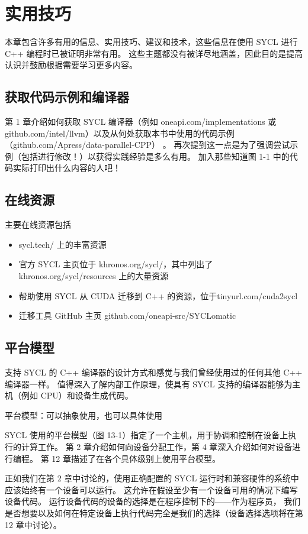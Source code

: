\section{实用技巧}
本章包含许多有用的信息、实用技巧、建议和技术，这些信息在使用 SYCL 进行 C++ 编程时已被证明非常有用。 
这些主题都没有被详尽地涵盖，因此目的是提高认识并鼓励根据需要学习更多内容。

\subsection{获取代码示例和编译器}
第 1 章介绍如何获取 SYCL 编译器（例如 oneapi.com/implementations 
或 github.com/intel/llvm）以及从何处获取本书中使用的代码示例（github.com/Apress/data-parallel-CPP） 。 
再次提到这一点是为了强调尝试示例（包括进行修改！）以获得实践经验是多么有用。 
加入那些知道图 1-1 中的代码实际打印出什么内容的人吧！

\subsection{在线资源}
主要在线资源包括

\begin{itemize}
	\item sycl.tech/ 上的丰富资源

	\item 官方 SYCL 主页位于 khronos.org/sycl/，其中列出了 khronos.org/sycl/resources 上的大量资源

	\item 帮助使用 SYCL 从 CUDA 迁移到 C++ 的资源，位于tinyurl.com/cuda2sycl

	\item 迁移工具 GitHub 主页 github.com/oneapi-src/SYCLomatic
\end{itemize}

\subsection{平台模型}
支持 SYCL 的 C++ 编译器的设计方式和感觉与我们曾经使用过的任何其他 C++ 编译器一样。 
值得深入了解内部工作原理，使具有 SYCL 支持的编译器能够为主机（例如 CPU）和设备生成代码。

{\color{red} 平台模型：可以抽象使用，也可以具体使用}

SYCL 使用的平台模型（图 13-1）指定了一个主机，用于协调和控制在设备上执行的计算工作。 
第 2 章介绍如何向设备分配工作，第 4 章深入介绍如何对设备进行编程。 第 12 章描述了在各个具体级别上使用平台模型。

正如我们在第 2 章中讨论的，使用正确配置的 SYCL 运行时和兼容硬件的系统中应该始终有一个设备可以运行。 
这允许在假设至少有一个设备可用的情况下编写设备代码。 
运行设备代码的设备的选择是在程序控制下的——作为程序员，
我们是否想要以及如何在特定设备上执行代码完全是我们的选择（设备选择选项将在第 12 章中讨论）。

